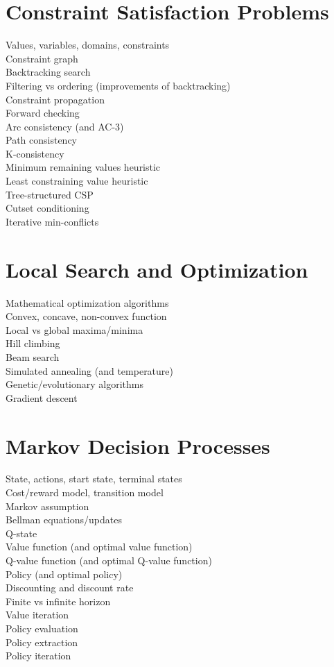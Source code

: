 \documentclass[a4paper]{article}
\begin{document}
\begin{multicols*}{2}
\section{Constraint Satisfaction Problems}
Values, variables, domains, constraints \\
Constraint graph \\
Backtracking search \\
Filtering vs ordering (improvements of backtracking) \\
Constraint propagation \\
Forward checking \\
Arc consistency (and AC-3)\\
Path consistency \\
K-consistency \\
Minimum remaining values heuristic \\
Least constraining value heuristic \\
Tree-structured CSP \\
Cutset conditioning \\
Iterative min-conflicts

\section{Local Search and Optimization}
Mathematical optimization algorithms \\
Convex, concave, non-convex function \\
Local vs global maxima/minima \\
Hill climbing \\
Beam search \\
Simulated annealing (and temperature) \\
Genetic/evolutionary algorithms \\
Gradient descent



\section{Markov Decision Processes}
State, actions, start state, terminal states\\
Cost/reward model, transition model \\
Markov assumption \\
Bellman equations/updates \\
Q-state \\
Value function (and optimal value function)\\
Q-value function (and optimal Q-value function) \\
Policy (and optimal policy)\\
Discounting and discount rate \\
Finite vs infinite horizon \\
Value iteration \\
Policy evaluation \\
Policy extraction \\
Policy iteration \\


\end{multicols*}
\end{document}
